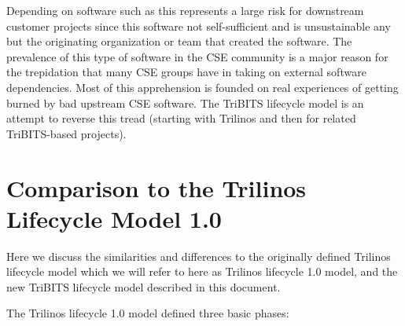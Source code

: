 \documentclass[11pt]{SANDreport}
\begin{document}
Depending on software such as this represents a large risk for
downstream customer projects since this software not self-sufficient
and is unsustainable any but the originating organization or team that
created the software.  The prevalence of this type of software in the
CSE community is a major reason for the trepidation that many CSE
groups have in taking on external software dependencies.  Most of this
apprehension is founded on real experiences of getting burned by bad
upstream CSE software.  The TriBITS lifecycle model is an attempt to
reverse this tread (starting with Trilinos and then for related
TriBITS-based projects).


%
\section{Comparison to the Trilinos Lifecycle Model 1.0}
\label{sec:compare_with_lifecycle_1.0_model}
%

Here we discuss the similarities and differences to the originally
defined Trilinos lifecycle model {}\cite{TrilinosLifecycleModel2007}
which we will refer to here as Trilinos lifecycle 1.0 model, and the
new TriBITS lifecycle model described in this document.

The Trilinos lifecycle 1.0 model defined three basic phases:
\end{document}
